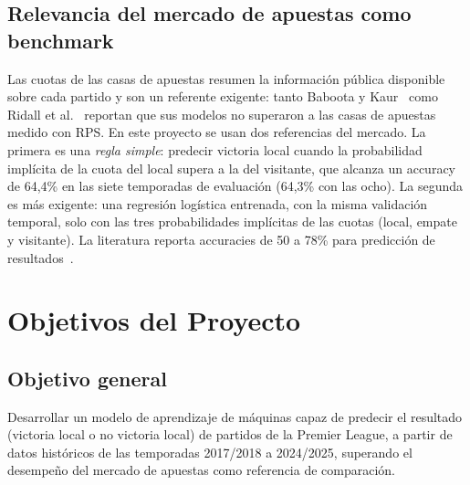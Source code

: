 \documentclass{ieeeaccess}
\begin{document}
\subsection{Relevancia del mercado de apuestas como benchmark}
Las cuotas de las casas de apuestas resumen la información pública disponible sobre cada partido y son un referente exigente: tanto Baboota y Kaur~\cite{baboota2019predictive} como Ridall et al.~\cite{ridall2025bayesian} reportan que sus modelos no superaron a las casas de apuestas medido con RPS. En este proyecto se usan dos referencias del mercado. La primera es una \textit{regla simple}: predecir victoria local cuando la probabilidad implícita de la cuota del local supera a la del visitante, que alcanza un accuracy de 64,4\% en las siete temporadas de evaluación (64,3\% con las ocho). La segunda es más exigente: una regresión logística entrenada, con la misma validación temporal, solo con las tres probabilidades implícitas de las cuotas (local, empate y visitante). La literatura reporta accuracies de 50 a 78\% para predicción de resultados~\cite{ricogonzalez2023ml}.

\section{Objetivos del Proyecto}
\label{sec:objetivos}

\subsection{Objetivo general}
Desarrollar un modelo de aprendizaje de máquinas capaz de predecir el resultado (victoria local o no victoria local) de partidos de la Premier League, a partir de datos históricos de las temporadas 2017/2018 a 2024/2025, superando el desempeño del mercado de apuestas como referencia de comparación.
\end{document}
